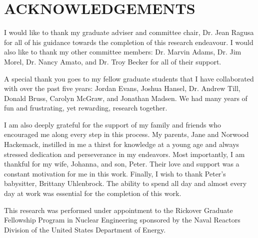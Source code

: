 %
%
%


\chapter*{ACKNOWLEDGEMENTS}


I would like to thank my graduate adviser and committee chair, Dr. Jean Ragusa for all of his guidance towards the completion of this research endeavour. I would also like to thank my other committee members: Dr. Marvin Adams, Dr. Jim Morel, Dr. Nancy Amato, and Dr. Troy Becker for all of their support.

A special thank you goes to my fellow graduate students that I have collaborated with over the past five years: Jordan Evans, Joshua Hansel, Dr. Andrew Till, Donald Bruss, Carolyn McGraw, and Jonathan Madsen. We had many years of fun and frustrating, yet rewarding, research together.

I am also deeply grateful for the support of my family and friends who encouraged me along every step in this process. My parents, Jane and Norwood Hackemack, instilled in me a thirst for knowledge at a young age and always stressed dedication and perseverance in my endeavors. Most importantly, I am thankful for my wife, Johanna, and son, Peter. Their love and support was a constant motivation for me in this work. Finally, I wish to thank Peter's babysitter, Brittany Uhlenbrock. The ability to spend all day and almost every day at work was essential for the completion of this work.

This research was performed under appointment to the Rickover Graduate Fellowship Program in Nuclear Engineering sponsored by the Naval Reactors Division of the United States Department of Energy.


\pagebreak{}